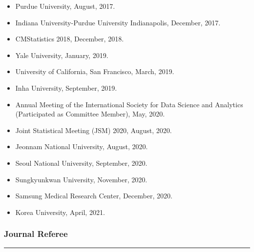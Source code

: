 \documentclass[]{book}
\begin{document}
\begin{itemize}
\item
  Purdue University, August, 2017.
\item
  Indiana University-Purdue University Indianapolis, December, 2017.
\item
  CMStatistics 2018, December, 2018.
\item
  Yale University, January, 2019.
\item
  University of California, San Francisco, March, 2019.
\item
  Inha University, September, 2019.
\item
  Annual Meeting of the International Society for Data Science and Analytics (Participated as Committee Member), May, 2020.
\item
  Joint Statistical Meeting (JSM) 2020, August, 2020.
\item
  Jeonnam National University, August, 2020.
\item
  Seoul National University, September, 2020.
\item
  Sungkyunkwan University, November, 2020.
\item
  Samsung Medical Research Center, December, 2020.
\item
  Korea University, April, 2021.
\end{itemize}

\hypertarget{journal-referee}{%
\subsubsection*{Journal Referee}\label{journal-referee}}

\begin{center}\rule{0.5\linewidth}{0.5pt}\end{center}
\end{document}
